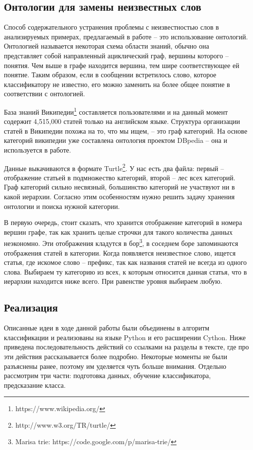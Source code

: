 \subsection{Онтологии для замены неизвестных слов}\label{ontology}
Способ содержательного устранения проблемы с неизвестностью слов в анализируемых примерах,
предлагаемый в работе -- это использование онтологий. Онтологией называется некоторая схема области
знаний, обычно она представляет собой направленный ациклический граф, вершины которого --
понятия. Чем выше в графе находится вершина, тем шире соответствующее ей понятие. Таким образом,
если в сообщении встретилось слово, которое классификатору не известно, его можно заменить на более
общее понятие в соответствии с онтологией.

База знаний Википедии\footnote{https://www.wikipedia.org/} составляется пользователями и на данный
момент содержит 4,515,000 статей только на английском языке. Структура организации статей в
Википедии похожа на то, что мы ищем, -- это граф категорий.
На основе категорий википедии уже составлена онтология проектом DBpedia\cite{dbpedia-swj} -- она и
используется в работе.

Данные выкачиваются в формате
Turtle\footnote{http://www.w3.org/TR/turtle/}. У нас есть два файла: первый -- отображение статьей в
подмножество категорий, второй -- лес всех категорий. Граф категорий сильно несвязный, большинство
категорий не участвуют ни в какой иерархии. Согласно этим особенностям нужно решить задачу хранения
онтологии и поиска нужной категории.

В первую очередь, стоит сказать, что хранится отображение категорий в номера вершин графе, так как
хранить целые строчки для такого количества данных неэкономно. Эти отображения кладутся в
бор\footnote{Marisa trie: https://code.google.com/p/marisa-trie/}, в
соседнем боре запоминаются отображения статей в категории.
Когда появляется неизвестное слово, ищется статья, где искомое
слово -- префикс, так как названия статей не всегда из одного слова. Выбираем ту категорию из всех, к которым относится данная статья, что в иерархии находится ниже всего. При равенстве уровня выбираем любую.

\subsection{Реализация}
Описанные идеи в ходе данной работы были объединены в алгоритм классификации и реализованы на языке
Python и его расширении Cython. Ниже
приведена последовательность действий со ссылками на разделы в тексте, где про эти действия
рассказывается более подробно. Некоторые моменты не были разъяснены ранее, поэтому им уделяется чуть
больше внимания. Отдельно рассмотрим три части: подготовка данных, обучение классификатора,
предсказание класса.

